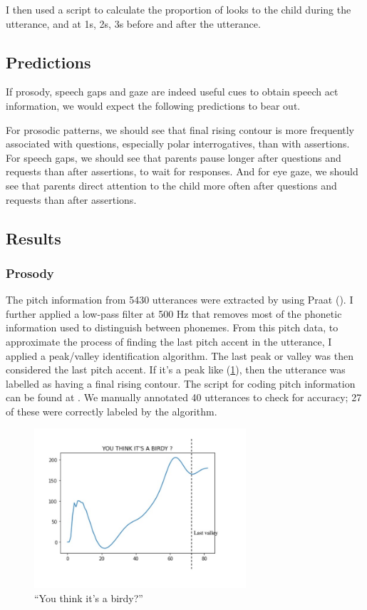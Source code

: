 I then used a script to calculate the proportion of looks to the child during the utterance, and at 1s, 2s, 3s before and after the utterance.%

\subsection{Predictions}
\label{sec:engsp:predictions}
If prosody, speech gaps and gaze are indeed useful cues to obtain speech act information, we would expect the following predictions to bear out.

For prosodic patterns, we should see that final rising contour is more frequently associated with questions, especially polar interrogatives, than with assertions.
For speech gaps, we should see that parents pause longer after questions and requests than after assertions, to wait for responses.
And for eye gaze, we should see that parents direct attention to the child more often after questions and requests than after assertions. 


\subsection{Results}
\label{sec:engsp:results}

\subsubsection{Prosody}
\label{sec:engsp:results:prosody}
The pitch information from 5430 utterances were extracted by using Praat (\citealt{praat}). I further applied a low-pass filter at 500 Hz that removes most of the phonetic information used to distinguish between phonemes. From this pitch data, to approximate the process of finding the last pitch accent in the utterance, I applied a peak/valley identification algorithm. The last peak or valley was then considered the last pitch accent. If it's a peak like (\ref{fig:rise-example}), then the utterance was labelled as having a final rising contour. The script for coding pitch information can be found at \mycode{}. We manually annotated 40 utterances to check for accuracy; 27 of these were correctly labeled by the algorithm.  


\begin{figure}[H]
    \centering
    \includegraphics[width=0.7\textwidth]{figures/pitch-rise.jpg}
    \caption{``You think it's a birdy?''}
    \label{fig:rise-example}
\end{figure}

